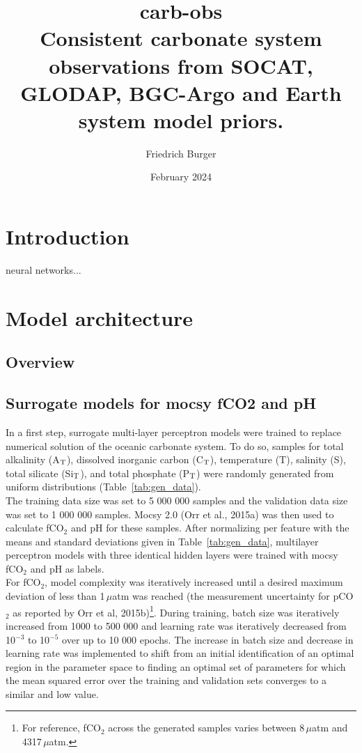 \documentclass{article}
\title{\textbf{carb-obs} \\
\large Consistent carbonate system observations from SOCAT, GLODAP, BGC-Argo and Earth system model priors.}
\author{Friedrich Burger}
\date {February 2024}
\begin{document}
	
	\maketitle
	\tableofcontents
	\section{Introduction}
	neural networks...\cite{goodfellow2016}
	\section{Model architecture}
	\subsection{Overview}
	\subsection{Surrogate models for mocsy fCO2 and pH}
	In a first step, surrogate multi-layer perceptron models were trained to replace numerical solution of the oceanic carbonate system. To do so, samples for total alkalinity (A$_\textup{T}$), dissolved inorganic carbon (C$_\textup{T}$), temperature (T),  salinity (S), total silicate (Si$_\textup{T}$), and total phosphate (P$_\textup{T}$) were randomly generated from uniform distributions (Table~\ref{tab:gen_data}). \\
	The training data size was set to 5 000 000 samples and the validation data size was set to 1 000 000 samples. Mocsy 2.0 (Orr et al., 2015a) was then used to calculate fCO$_2$ and pH for these samples. After normalizing per feature with the means and standard deviations given in Table~\ref{tab:gen_data}, multilayer perceptron models with three identical hidden layers were trained with mocsy fCO$_2$ and pH as labels. \\
	For fCO$_2$, model complexity was iteratively increased until a desired maximum deviation of less than 1\,$\mu$atm was reached (the measurement uncertainty for pCO$_2$ as reported by Orr et al, 2015b)\footnote{For reference, fCO$_2$ across the generated samples varies between 8\,$\mu$atm and 4317\,$\mu$atm.}. During training, batch size was iteratively increased from 1000 to 500 000 and learning rate was iteratively decreased from 10$^{-3}$ to 10$^{-5}$ over up to 10 000 epochs. The increase in batch size and decrease in learning rate was implemented to shift from an initial identification of an optimal region in the parameter space to finding an optimal set of parameters for which the mean squared error over the training and validation sets converges to a similar and low value. \\
\end{document}
